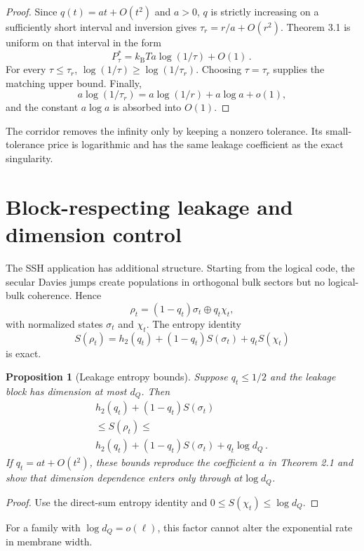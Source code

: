 \documentclass[11pt,a4paper]{article}
\newtheorem{proposition}[theorem]{Proposition}
\theoremstyle{remark}
\begin{document}
\begin{proof}
Since $q(t)=a t+O(t^{2})$ and $a>0$, $q$ is strictly increasing on a sufficiently short interval and inversion gives $\tau_r=r/a+O(r^{2})$. Theorem 3.1 is uniform on that interval in the form
\[
P_\tau^*=k_{\mathrm B} T a \log(1/\tau)+O(1)\mathpunct{.}
\]
For every $\tau\le \tau_r$, $\log(1/\tau)\ge \log(1/\tau_r)$. Choosing $\tau=\tau_r$ supplies the matching upper bound. Finally,
\[
a \log(1/\tau_r)=a \log(1/r)+a \log a+o(1)\mathpunct{,}
\]
and the constant $a \log a$ is absorbed into $O(1)$.
\end{proof}
The corridor removes the infinity only by keeping a nonzero tolerance. Its small-tolerance price is logarithmic and has the same leakage coefficient as the exact singularity.
\section{Block-respecting leakage and dimension control}
The SSH application has additional structure. Starting from the logical code, the secular Davies jumps create populations in orthogonal bulk sectors but no logical-bulk coherence. Hence
\[
\rho_t=(1-q_t)\sigma_t \oplus q_t \chi_t\mathpunct{,}
\]
with normalized states $\sigma_t$ and $\chi_t$. The entropy identity
\[
S(\rho_t)=h_2(q_t)+(1-q_t)S(\sigma_t)+q_t S(\chi_t)
\]
is exact.
\begin{proposition}[Leakage entropy bounds]
Suppose $q_t\le 1/2$ and the leakage block has dimension at most $d_Q$. Then
\[
\begin{gathered}
h_2(q_t)+(1-q_t)S(\sigma_t) \\
\le S(\rho_t)\le  \\
h_2(q_t)+(1-q_t)S(\sigma_t)+q_t \log d_Q\mathpunct{.}
\end{gathered}
\]
If $q_t=a t+O(t^{2})$, these bounds reproduce the coefficient $a$ in Theorem 2.1 and show that dimension dependence enters only through $a t \log d_Q$.
\end{proposition}
\begin{proof}
Use the direct-sum entropy identity and $0\le S(\chi_t)\le \log d_Q$.
\end{proof}
For a family with $\log d_Q=o(\ell)$, this factor cannot alter the exponential rate in membrane width.
\end{document}
